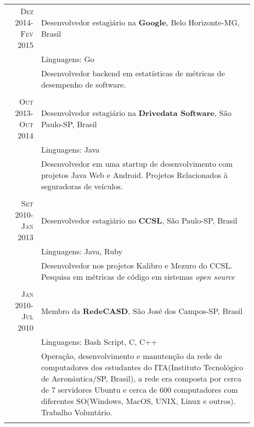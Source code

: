 \documentclass[a4paper,10pt]{article} %
\begin{document}
\begin{tabular}{r|p{11cm}}

\textsc{Dez 2014-Fev 2015} & Desenvolvedor estagiário na \textbf{Google}, Belo Horizonte-MG, Brasil \emph{}\\
& \footnotesize{Linguagens: Go}\\
       & \footnotesize{Desenvolvedor backend em estatísticas de métricas de desempenho de software.} \\
       \multicolumn{2}{c}{} \\
       
       
\textsc{Out 2013-Out 2014} & Desenvolvedor estagiário na \textbf{Drivedata Software}, São Paulo-SP, Brasil \emph{}\\
& \footnotesize{Linguagens: Java}\\
       & \footnotesize{Desenvolvedor em uma startup de desenvolvimento com projetos Java Web e Android. Projetos Relacionados à seguradoras de veículos.} \\
       \multicolumn{2}{c}{} \\	
       

\textsc{Set 2010-Jan 2013} & Desenvolvedor estagiário no \textbf{CCSL}, São Paulo-SP, Brasil \emph{}\\
& \footnotesize{Linguagens: Java, Ruby}\\
       & \footnotesize{Desenvolvedor nos projetos Kalibro e Mezuro do CCSL. Pesquisa em métricas de código em
       sistemas \emph{open source}} \\
       \multicolumn{2}{c}{} \\
	

\textsc{Jan 2010-Jul 2010} & Membro da \textbf{RedeCASD}, São José dos Campos-SP, Brasil \emph{}\\
& \footnotesize{Linguagens: Bash Script, C, C++}\\
       & \footnotesize{Operação, desenvolvimento e manutenção da rede de computadores dos estudantes do ITA(Instituto
       Tecnológico de Aeronáutica/SP, Brasil), a rede era composta por cerca de 7 servidores Ubuntu e cerca
       de 600 computadores com diferentes SO(Windows, MacOS, UNIX, Linux e outros). Trabalho Voluntário.}\\
	\multicolumn{2}{c}{} \\


\end{tabular}
\end{document}
